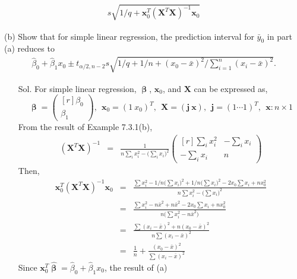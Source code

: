 \documentclass[12pt]{article} %
\begin{document}
\begin{enumerate}
\begin{itemize}
\begin{eqnarray*}
	  s\sqrt{1/q+\mathbf{x}^{T}_{0}(\mathbf{X}^{T}\mathbf{X})^{-1}\mathbf{x}_{0}}
	 \end{eqnarray*}	 	  
	\end{itemize}
	(b) Show that for simple linear regression, the prediction interval for $\bar{y}_{0}$ 
	in part (a) reduces to
	\begin{eqnarray*}
	 \hat{\beta}_{0}+\hat{\beta}_{1}x_{0}\pm t_{\alpha /2,n-2}
	 s\sqrt{1/q+1/n+(x_{0}-\bar{x})^{2}/\sum_{i=1}^{n}(x_{i}-\bar{x})^{2}}.
	\end{eqnarray*}
	\begin{itemize}
	 \item[Sol.] For simple linear regression, $\pmb{\upbeta}$, $\mathbf{x}_{0}$, and $\mathbf{X}$ 
	 can be expressed as, 
	 \begin{equation*}
	  \pmb{\upbeta}=
	  \begin{pmatrix}[r]
	  \beta_{0} \\
	  \beta_{1}
	  \end{pmatrix},~~
	  \mathbf{x}_{0}=(1~x_{0})^{T},~~
	  \mathbf{X}=(\mathbf{j}~\mathbf{x}),~~
	  \mathbf{j}=(1\cdots 1)^{T},~~\mathbf{x}:n\times 1
	 \end{equation*}
	 From the result of Example 7.3.1(b), 
	 \begin{eqnarray*}
	 (\mathbf{X}^{T}\mathbf{X})^{-1}&=&
	 \frac{1}{n\sum_{i}x_{i}^{2}-\big ( \sum_{i}{x_{i}} \big )^{2}}
	 \begin{pmatrix}[r]
	  \sum_{i}x_{i}^{2} & -\sum_{i}x_{i} \\
	  -\sum_{i}x_{i} & n
	 \end{pmatrix}
	 \end{eqnarray*}
	 Then, 
	 \begin{eqnarray*}
	  \mathbf{x}^{T}_{0}(\mathbf{X}^{T}\mathbf{X})^{-1}\mathbf{x}_{0}&=&
	  \frac{\sum{x_{i}^{2}}-1/n\big ( \sum{x_{i}}\big )^{2}+1/n\big ( \sum{x_{i}}\big )^{2}
	  -2x_{0}\sum{x_{i}}+nx_{0}^{2}}{n\sum{x_{i}^{2}}-\big (\sum{x_{i}} \big )^{2}}\\
	  &=&
	  \frac{\sum{x_{i}^{2}}-n\bar{x}^{2}+n\bar{x}^{2}-2x_{0}\sum{x_{i}}+nx_{0}^{2}}
	  {n\big (\sum{x_{i}^{2}}-n\bar{x}^{2} \big )}\\
	  &=&
	  \frac{\sum(x_{i}-\bar{x})^{2}+n(x_{0}-\bar{x})^{2}}{n\sum(x_{i}-\bar{x})^{2}}\\
	  &=&
	  \frac{1}{n}+\frac{(x_{0}-\bar{x})^{2}}{\sum(x_{i}-\bar{x})^{2}}
	 \end{eqnarray*}
	 Since $\mathbf{x}_{0}^{T}\hat{\pmb{\upbeta}}=\hat{\beta}_{0}+\hat{\beta}_{1}x_{0}$, the result of (a)

\end{itemize}
\end{enumerate}
\end{document}
